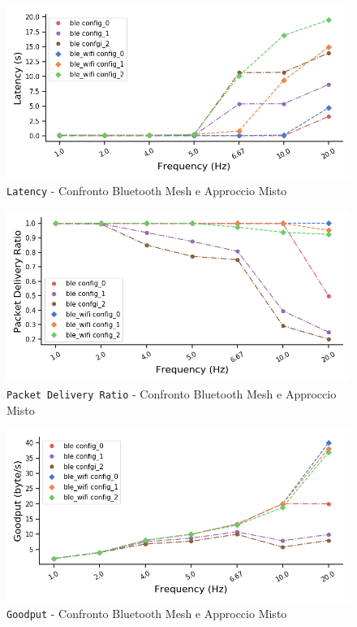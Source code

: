 \begin{figure}[hbt!]
    \centering
    \includegraphics[width = 1\textwidth]{images/graphs/mixed_latency.png}
    \caption{\texttt{Latency} - Confronto Bluetooth Mesh e Approccio Misto}
    \label{graph:mixed_latency}
\end{figure}

\begin{figure}[hbt!]
    \centering
    \includegraphics[width = 1\textwidth]{images/graphs/mixed_pdr.png}
    \caption{\texttt{Packet Delivery Ratio} - Confronto Bluetooth Mesh e Approccio Misto}
    \label{graph:mixed_pdr}
\end{figure}

\begin{figure}[hbt!]
    \centering
    \includegraphics[width = 1\textwidth]{images/graphs/mixed_goodput.png}
    \caption{\texttt{Goodput} - Confronto Bluetooth Mesh e Approccio Misto}
    \label{graph:mixed_goodput}
\end{figure}

